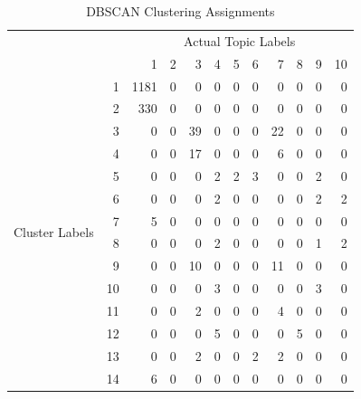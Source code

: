 \documentclass[11pt]{article}
\begin{document}
\begin{table}[htbp]
  \centering
  \caption{DBSCAN Clustering Assignments}
    \begin{tabular}{rr|r|r|r|r|r|r|r|r|r|r}
    \toprule
          &       & \multicolumn{10}{c}{Actual Topic Labels} \\
          &       & 1     & 2     & 3     & 4     & 5     & 6     & 7     & 8     & 9     & 10 \\
    \midrule \multicolumn{1}{c}{\multirow{18}[10]{*}{Cluster Labels}} & 1     & 1181  & 0     & 0     & 0     & 0     & 0     & 0     & 0     & 0     & 0 \\
    \multicolumn{1}{c}{} & 2     & 330   & 0     & 0     & 0     & 0     & 0     & 0     & 0     & 0     & 0 \\
    \multicolumn{1}{c}{} & 3     & 0     & 0     & 39    & 0     & 0     & 0     & 22    & 0     & 0     & 0 \\
    \multicolumn{1}{c}{} & 4     & 0     & 0     & 17    & 0     & 0     & 0     & 6     & 0     & 0     & 0 \\
    \multicolumn{1}{c}{} & 5     & 0     & 0     & 0     & 2     & 2     & 3     & 0     & 0     & 2     & 0 \\
    \multicolumn{1}{c}{} & 6     & 0     & 0     & 0     & 2     & 0     & 0     & 0     & 0     & 2     & 2 \\
    \multicolumn{1}{c}{} & 7     & 5     & 0     & 0     & 0     & 0     & 0     & 0     & 0     & 0     & 0 \\
    \multicolumn{1}{c}{} & 8     & 0     & 0     & 0     & 2     & 0     & 0     & 0     & 0     & 1     & 2 \\
    \multicolumn{1}{c}{} & 9     & 0     & 0     & 10    & 0     & 0     & 0     & 11    & 0     & 0     & 0 \\
    \multicolumn{1}{c}{} & 10    & 0     & 0     & 0     & 3     & 0     & 0     & 0     & 0     & 3     & 0 \\
    \multicolumn{1}{c}{} & 11    & 0     & 0     & 2     & 0     & 0     & 0     & 4     & 0     & 0     & 0 \\
    \multicolumn{1}{c}{} & 12    & 0     & 0     & 0     & 5     & 0     & 0     & 0     & 5     & 0     & 0 \\
    \multicolumn{1}{c}{} & 13    & 0     & 0     & 2     & 0     & 0     & 2     & 2     & 0     & 0     & 0 \\
    \multicolumn{1}{c}{} & 14    & 6     & 0     & 0     & 0     & 0     & 0     & 0     & 0     & 0     & 0 \\

\end{tabular}
\end{table}
\end{document}
